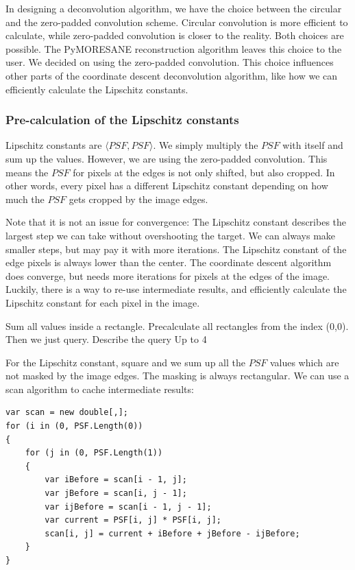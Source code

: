 In designing a deconvolution algorithm, we have the choice between the circular and the zero-padded convolution scheme. Circular convolution is more efficient to calculate, while zero-padded convolution is closer to the reality. Both choices are possible. The PyMORESANE reconstruction algorithm \cite{kenyon2019pymoresane} leaves this choice to the user. We decided on using the zero-padded convolution. This choice influences other parts of the coordinate descent deconvolution algorithm, like how we can efficiently calculate the Lipschitz constants.

\subsubsection{Pre-calculation of the Lipschitz constants}
Lipschitz constants are $\langle PSF, PSF \rangle$. We simply multiply the $PSF$ with itself and sum up the values. However, we are using the zero-padded convolution. This means the $PSF$ for pixels at the edges is not only shifted, but also cropped. In other words, every pixel has a different Lipschitz constant depending on how much the $PSF$ gets cropped by the image edges.

Note that it is not an issue for convergence: The Lipschitz constant describes the largest step we can take without overshooting the target. We can always make smaller steps, but may pay it with more iterations. The Lipschitz constant of the edge pixels is always lower than the center. The coordinate descent algorithm does converge, but needs more iterations for pixels at the edges of the image. Luckily, there is a way to re-use intermediate results, and efficiently calculate the Lipschitz constant for each pixel in the image.

Sum all values inside a rectangle.
Precalculate all rectangles from the index (0,0). Then we just query.
Describe the query
Up to 4 

For the Lipschitz constant, square and we sum up all the $PSF$ values which are not masked by the image edges. The masking is always rectangular. We can use a scan algorithm to cache intermediate results:

\begin{lstlisting}
var scan = new double[,];
for (i in (0, PSF.Length(0))
{
	for (j in (0, PSF.Length(1))
	{
		var iBefore = scan[i - 1, j];
		var jBefore = scan[i, j - 1];
		var ijBefore = scan[i - 1, j - 1];
		var current = PSF[i, j] * PSF[i, j];
		scan[i, j] = current + iBefore + jBefore - ijBefore;
	}
}
\end{lstlisting}

